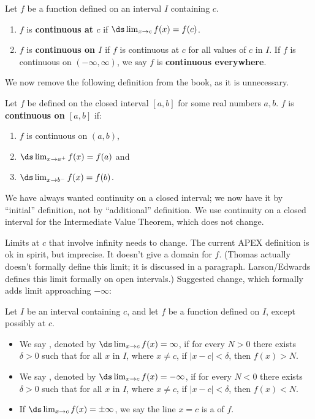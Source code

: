 \documentclass{article}
\begin{document}
{Let $f$ be a function defined on an interval $I$ containing $c$.  
	\begin{enumerate}
	\item		$f$ is \textbf{continuous at $c$} if $\ds \lim_{x\to c}f(x) = f(c)$.
	\item		$f$ is \textbf{continuous on $I$} if $f$ is continuous at $c$ for all values of $c$ in $I$. If $f$ is continuous on $(-\infty,\infty)$, we say $f$ is \textbf{continuous everywhere}.
	\end{enumerate}
}

We now remove the following definition from the book, as it is unnecessary.

{Let $f$ be defined on the closed interval $[a,b]$ for some real numbers $a,b$. $f$ is \textbf{continuous on $[a,b]$} if:
		\begin{enumerate}
		\item		$f$ is continuous on $(a,b)$,
		\item		$\ds \lim_{x\to a^+} f(x) = f(a)$ and 
		\item		$\ds \lim_{x\to b^-} f(x) = f(b)$.
		\end{enumerate}
		}
		
We have always wanted continuity on a closed interval; we now have it by ``initial'' definition, not by ``additional'' definition. We use continuity on a closed interval for the Intermediate Value Theorem, which does not change.

Limits at $c$ that involve infinity needs to change. The current APEX definition is ok in spirit, but imprecise. It doesn't give a domain for $f$. (Thomas actually doesn't formally define this limit; it is discussed in a paragraph. Larson/Edwards defines this limit formally on open intervals.) Suggested change, which formally adds limit approaching $-\infty$:

{Let $I$ be an interval containing $c$, and let $f$ be a function defined on $I$, except possibly at $c$. \begin{itemize}
	\item We say , denoted by $\ds \lim_{x\rightarrow c} f(x)=\infty$, if for every $N>0$ there exists $\delta>0$ such that for all $x$ in $I$, where $x\neq c$, if  $|x-c|<\delta$, then $f(x)> N$.   
	\item	We say , denoted by $\ds \lim_{x\rightarrow c} f(x)=-\infty$, if for every $N<0$ there exists $\delta>0$ such that for all $x$ in $I$, where $x\neq c$, if  $|x-c|<\delta$, then $f(x)<N$.   
	\item	If $\ds \lim_{x\rightarrow c} f(x)=\pm\infty$, we say the line $x=c$ is a  of $f$.
\end{itemize}
}
		
\end{document}
